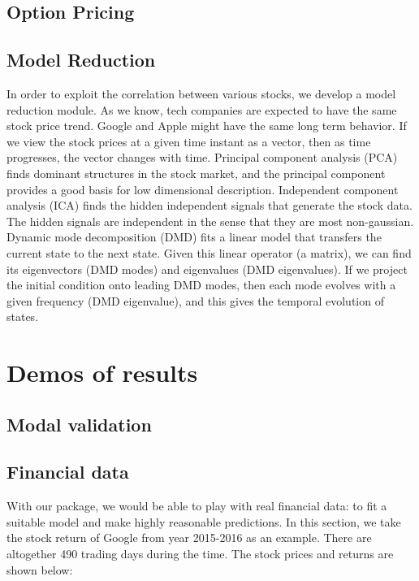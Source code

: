\documentclass[12pt,a4paper]{article}
\begin{document}
\subsection{Option Pricing}





\subsection{Model Reduction}
In order to exploit the correlation between various stocks, we develop a model reduction module. As we know, tech companies are expected to have the same stock price trend. Google and Apple might have the same long term behavior. If we view the stock prices at a given time instant as a vector, then as time progresses, the vector changes with time. Principal component analysis (PCA) \cite{jolliffe2002principal} finds dominant structures in the stock market, and the principal component provides a good basis for low dimensional description. Independent component analysis (ICA)\cite{hyvarinen2000independent}  finds the hidden independent signals that generate the stock data. The hidden signals are independent in the sense that they are most non-gaussian. Dynamic mode decomposition (DMD) \cite{jolliffe2002principal}\cite{rowley2009spectral} fits a linear model that transfers the current state to the next state. Given this linear operator (a matrix), we can find its eigenvectors (DMD modes) and eigenvalues (DMD eigenvalues). If we project the initial condition onto leading DMD modes, then each mode evolves with a given frequency (DMD eigenvalue), and this gives the temporal evolution of states.

\section{Demos of results}
\subsection{Modal validation}

\subsection{Financial data}
With our package, we would be able to play with real financial data: to fit a suitable model and make highly reasonable predictions. In this section, we take the stock return of Google from year 2015-2016 as an example. There are altogether 490 trading days during the time. The stock prices and returns are shown below:
\end{document}
